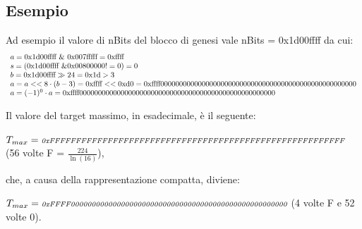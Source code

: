 \documentclass{article}
\begin{document}
\subsection{Esempio}
Ad esempio il valore di nBits del blocco di genesi vale nBits = 0x1d00ffff da cui:
\begin{equation}
    \begin{array}{ll}
        a = \textnormal{0x1d00ffff} \ \& \ \textnormal{0x007fffff} = \textnormal{0xffff} \\
        s = (\textnormal{0x1d00ffff} \ \& \textnormal{0x00800000} != 0) = 0 \\
        b = \textnormal{0x1d00ffff} \gg 24 = \textnormal{0x1d} > 3\\
        a = a << 8 \cdot (b - 3) = \textnormal{0xffff} << \textnormal{0xd0} = \textnormal{0xffff0000000000000000000000000000000000000000000000000000} \\
        a = (-1)^0 \cdot a =  \textnormal{0xffff0000000000000000000000000000000000000000000000000000}
    \end{array}
\end{equation}

Il valore del target massimo, in esadecimale, è il seguente:

$T_{max} = \textit{\scriptsize{0xFFFFFFFFFFFFFFFFFFFFFFFFFFFFFFFFFFFFFFFFFFFFFFFFFFFFFFFF}}$  (56 volte F = $\frac{224}{\ln(16)}$),

che, a causa della rappresentazione compatta, diviene:

$T_{max} = \textit{\scriptsize{0xFFFF0000000000000000000000000000000000000000000000000000}}$ (4 volte F e 52 volte 0).

\newpage



\end{document}
